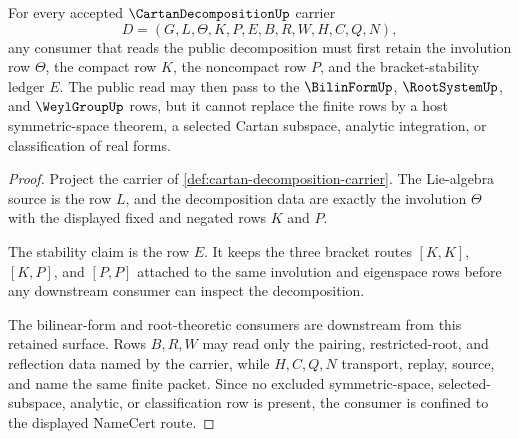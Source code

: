 \begin{theorem}
\label{thm:cartan-decomposition-involution-eigenspace-stability}
For every accepted $\CartanDecompositionUp$ carrier
$$
D=(G,L,\Theta,K,P,E,B,R,W,H,C,Q,N),
$$
any consumer that reads the public decomposition must first retain the involution row $\Theta$, the compact row $K$, the noncompact row $P$, and the bracket-stability ledger $E$. The public read may then pass to the $\BilinFormUp$, $\RootSystemUp$, and $\WeylGroupUp$ rows, but it cannot replace the finite rows by a host symmetric-space theorem, a selected Cartan subspace, analytic integration, or classification of real forms.
\end{theorem}
\begin{proof}
Project the carrier of \autoref{def:cartan-decomposition-carrier}. The Lie-algebra source is the row $L$, and the decomposition data are exactly the involution $\Theta$ with the displayed fixed and negated rows $K$ and $P$.

The stability claim is the row $E$. It keeps the three bracket routes $[K,K]$, $[K,P]$, and $[P,P]$ attached to the same involution and eigenspace rows before any downstream consumer can inspect the decomposition.

The bilinear-form and root-theoretic consumers are downstream from this retained surface. Rows $B,R,W$ may read only the pairing, restricted-root, and reflection data named by the carrier, while $H,C,Q,N$ transport, replay, source, and name the same finite packet. Since no excluded symmetric-space, selected-subspace, analytic, or classification row is present, the consumer is confined to the displayed NameCert route.
\end{proof}




